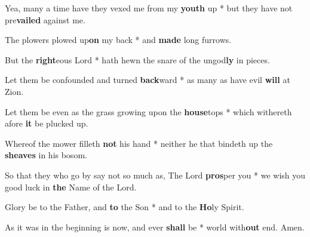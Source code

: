 \begin{multicols}{2}
	Yea, many a time have they vexed me from my \textbf{youth} up * but they have not pre\textbf{vailed} against me.
	
	The plowers plowed up\textbf{on} my back * and \textbf{made} long furrows.
	
	But the \textbf{right}eous Lord * hath hewn the snare of the ungod\textbf{ly} in pieces.
	
	Let them be confounded and turned \textbf{back}ward * as many as have evil \textbf{will} at Zion.
	
	Let them be even as the grass growing upon the \textbf{house}tops * which withereth afore \textbf{it} be plucked up.
	
	Whereof the mower filleth \textbf{not} his hand * neither he that bindeth up the \textbf{sheaves} in his bosom.
	
	So that they who go by say not so much as, The Lord \textbf{pros}per you * we wish you good luck in \textbf{the} Name of the Lord.
	
	Glory be to the Father, and \textbf{to} the Son * and to the \textbf{Ho}ly Spirit.
	
	As it was in the beginning is now, and ever \textbf{shall} be * world with\textbf{out} end. Amen.
\end{multicols}